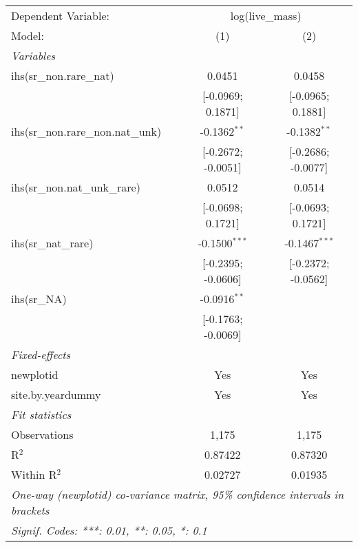 \begin{tabular}{lcc}
\tabularnewline\midrule\midrule
Dependent Variable:&\multicolumn{2}{c}{log(live\_mass)}\\
Model:&(1) & (2)\\
\midrule \emph{Variables}&   &  \\
ihs(sr\_non.rare\_nat)&0.0451 & 0.0458\\
  &[-0.0969; 0.1871] & [-0.0965; 0.1881]\\
ihs(sr\_non.rare\_non.nat\_unk)&-0.1362$^{**}$ & -0.1382$^{**}$\\
  &[-0.2672; -0.0051] & [-0.2686; -0.0077]\\
ihs(sr\_non.nat\_unk\_rare)&0.0512 & 0.0514\\
  &[-0.0698; 0.1721] & [-0.0693; 0.1721]\\
ihs(sr\_nat\_rare)&-0.1500$^{***}$ & -0.1467$^{***}$\\
  &[-0.2395; -0.0606] & [-0.2372; -0.0562]\\
ihs(sr\_NA)&-0.0916$^{**}$ &   \\
  &[-0.1763; -0.0069] &   \\
\midrule \emph{Fixed-effects}&   &  \\
newplotid & Yes & Yes\\
site.by.yeardummy & Yes & Yes\\
\midrule \emph{Fit statistics}&  & \\
Observations & 1,175&1,175\\
R$^2$ & 0.87422&0.87320\\
Within R$^2$ & 0.02727&0.01935\\
\midrule\midrule\multicolumn{3}{l}{\emph{One-way (newplotid) co-variance matrix, 95\% confidence intervals in brackets}}\\
\multicolumn{3}{l}{\emph{Signif. Codes: ***: 0.01, **: 0.05, *: 0.1}}\\
\end{tabular}


